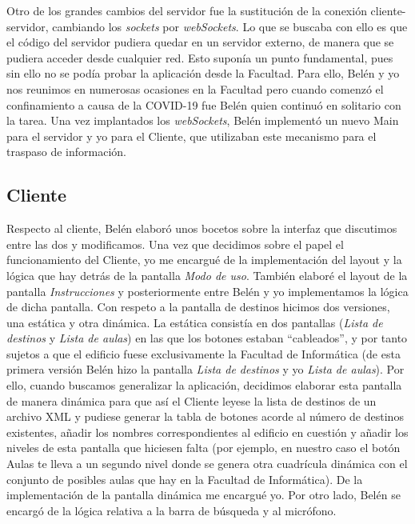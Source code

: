 Otro de los grandes cambios del servidor fue la sustitución de la conexión cliente-servidor, cambiando los \textit{sockets} por \textit{webSockets}. Lo que se buscaba con ello es que el código del servidor pudiera quedar en un servidor externo, de manera que se pudiera acceder desde cualquier red. Esto suponía un punto fundamental, pues sin ello no se podía probar la aplicación desde la Facultad. Para ello, Belén y yo nos reunimos en numerosas ocasiones en la Facultad pero cuando comenzó el confinamiento a causa de la COVID-19 fue Belén quien continuó en solitario con la tarea. Una vez implantados los \textit{webSockets}, Belén implementó un nuevo Main para el servidor y yo para el Cliente, que utilizaban este mecanismo para el traspaso de información.

\subsection{Cliente}

Respecto al cliente, Belén elaboró unos bocetos sobre la interfaz que discutimos entre las dos y modificamos. Una vez que decidimos sobre el papel el funcionamiento del Cliente, yo me encargué de la implementación del layout y la lógica que hay detrás de la pantalla \textit{Modo de uso}. También elaboré el layout de la pantalla \textit{Instrucciones} y posteriormente entre Belén y yo implementamos la lógica de dicha pantalla. Con respeto a la pantalla de destinos hicimos dos versiones, una estática y otra dinámica. La estática consistía en dos pantallas (\textit{Lista de destinos} y \textit{Lista de aulas}) en las que los botones estaban ``cableados'', y por tanto sujetos a que el edificio fuese exclusivamente la Facultad de Informática (de esta primera versión Belén hizo la pantalla \textit{Lista de destinos} y yo \textit{Lista de aulas}). Por ello, cuando buscamos generalizar la aplicación, decidimos elaborar esta pantalla de manera dinámica para que así el Cliente leyese la lista de destinos de un archivo XML y pudiese generar la tabla de botones acorde al número de destinos existentes, añadir los nombres correspondientes al edificio en cuestión y añadir los niveles de esta pantalla que hiciesen falta (por ejemplo, en nuestro caso el botón Aulas te lleva a un segundo nivel donde se genera otra cuadrícula dinámica con el conjunto de posibles aulas que hay en la Facultad de Informática). De la implementación de la pantalla dinámica me encargué yo. Por otro lado, Belén se encargó de la lógica relativa a la barra de búsqueda y al micrófono. 

